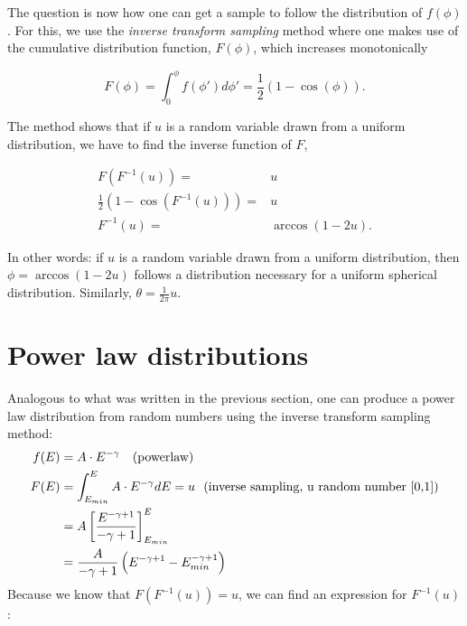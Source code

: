\begin{appendices}
\noindent The question is now how one can get a sample to follow the distribution of $f(\phi)$. For this, we use the \textit{inverse transform sampling} method where one makes use of the cumulative distribution function, $F(\phi)$, which increases monotonically

\begin{equation}
F(\phi) = \int^\phi_0 f(\phi')d\phi' = \frac{1}{2} \left(1-\cos(\phi)\right).
\end{equation}

\noindent The method shows that if $u$ is a random variable drawn from a uniform distribution, we have to find the inverse function of $F$,

\begin{align}
F(F^{-1}(u)) =& u \\
\frac{1}{2} \left(1-\cos(F^{-1}(u))\right) =& u\\
F^{-1}(u) =& \arccos(1-2u).
\end{align}

\noindent In other words: if $u$ is a random variable drawn from a uniform distribution, then $\phi = \arccos(1-2u)$ follows a distribution necessary for a uniform spherical distribution. Similarly, $\theta = \frac{1}{2\pi} u$.
\section{Power law distributions}
Analogous to what was written in the previous section, one can produce a power law distribution from random numbers using the inverse transform sampling method: 
\begin{equation}
\begin{split}
f(E) &= A\cdot E^{-\gamma} \rm\ \ \ (power law)\\
F(E) &= \int^{E}_{E_{min}} A \cdot E^{-\gamma} dE = u \text{\ \ (inverse sampling, u random number [0,1])}\\
&= A \left[\frac{E^{-\gamma+1}}{-\gamma+1}\right]^E_{E_{min}}\\
&= \frac{A}{-\gamma+1}\left(E^{-\gamma+1}-E_{min}^{-\gamma+1}\right)\\
\end{split}
\end{equation}
\vspace{3mm}
\noindent Because we know that $F\left(F^{-1}(u)\right) = u$, we can find an expression for $F^{-1}(u)$:


\end{appendices}
